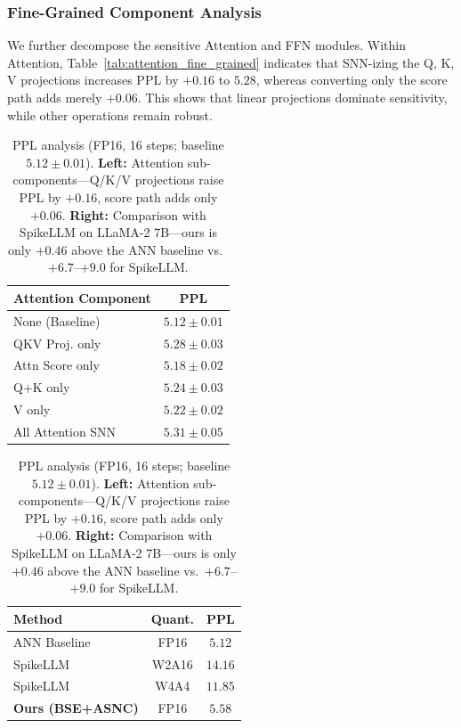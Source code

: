 \documentclass{article}
\theoremstyle{plain}
\theoremstyle{definition}
\theoremstyle{remark}
\begin{document}
\subsubsection{Fine-Grained Component Analysis}

We further decompose the sensitive Attention and FFN modules. Within Attention, Table~\ref{tab:attention_fine_grained} indicates that SNN-izing the Q, K, V projections increases PPL by $+0.16$ to $5.28$, whereas converting only the score path adds merely $+0.06$. This shows that linear projections dominate sensitivity, while other operations remain robust.

\begin{table}[h!]
\centering
\caption{PPL analysis (FP16, 16 steps; baseline $5.12\pm0.01$). \textbf{Left:} Attention sub-components---Q/K/V projections raise PPL by $+0.16$, score path adds only $+0.06$. \textbf{Right:} Comparison with SpikeLLM on LLaMA-2 7B---ours is only $+0.46$ above the ANN baseline vs.\ $+6.7$--$+9.0$ for SpikeLLM.}
\label{tab:attention_fine_grained}
\label{tab:spikellm_comparison}
\vspace{0.5em}
\begin{minipage}[t]{0.46\textwidth}
\centering
\small
\begin{tabular}{lc}
\hline
\textbf{Attention Component} & \textbf{PPL} \\
\hline
None (Baseline)       & $5.12\pm 0.01$ \\
QKV Proj. only        & $5.28 \pm 0.03$ \\
Attn Score only       & $5.18 \pm 0.02$ \\
Q+K only              & $5.24 \pm 0.03$ \\
V only                & $5.22 \pm 0.02$ \\
All Attention SNN     & $5.31 \pm 0.05$ \\
\hline
\end{tabular}
\end{minipage}
\hfill
\begin{minipage}[t]{0.50\textwidth}
\centering
\small
\begin{tabular}{lcc}
\hline
\textbf{Method} & \textbf{Quant.} & \textbf{PPL} \\
\hline
ANN Baseline              & FP16  & $5.12$ \\
SpikeLLM                  & W2A16 & $14.16$ \\
SpikeLLM                  & W4A4  & $11.85$ \\
\textbf{Ours (BSE+ASNC)}  & FP16  & $\mathbf{5.58}$ \\
\hline
\end{tabular}
\end{minipage}
\end{table}
\end{document}
